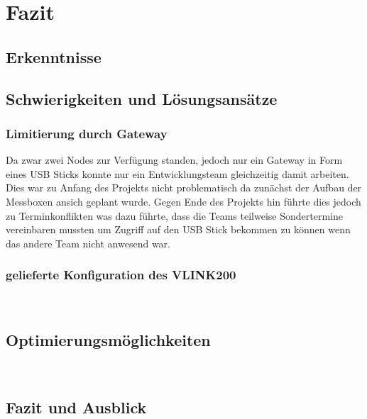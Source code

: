 \chapter{Fazit}
\label{cha:fazit}
\todo{}
\section{Erkenntnisse}

\section{Schwierigkeiten und L\"osungsans\"atze}
\label{sec:probleme}
\subsection{Limitierung durch Gateway}
Da zwar zwei Nodes zur Verfügung standen, jedoch nur ein Gateway in Form eines USB Sticks konnte nur ein Entwicklungsteam gleichzeitig damit arbeiten.
Dies war zu Anfang des Projekts nicht problematisch da zunächst der Aufbau der Messboxen ansich geplant wurde.
Gegen Ende des Projekts hin führte dies jedoch zu Terminkonflikten was dazu führte,
dass die Teams teilweise Sondertermine vereinbaren mussten um Zugriff auf den USB Stick bekommen zu können wenn das andere Team nicht anwesend war.

\subsection{gelieferte Konfiguration des VLINK200}\
\section{Optimierungsm\"oglichkeiten}\
\section{Fazit und Ausblick}